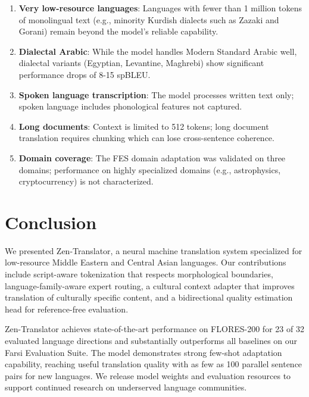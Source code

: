 \documentclass[11pt,twocolumn]{article}
\begin{document}
\begin{enumerate}[leftmargin=*,noitemsep]
  \item \textbf{Very low-resource languages}: Languages with fewer than
        1 million tokens of monolingual text (e.g., minority Kurdish
        dialects such as Zazaki and Gorani) remain beyond the model's
        reliable capability.
  \item \textbf{Dialectal Arabic}: While the model handles Modern Standard
        Arabic well, dialectal variants (Egyptian, Levantine, Maghrebi)
        show significant performance drops of 8-15 spBLEU.
  \item \textbf{Spoken language transcription}: The model processes written
        text only; spoken language includes phonological features not captured.
  \item \textbf{Long documents}: Context is limited to 512 tokens; long
        document translation requires chunking which can lose cross-sentence
        coherence.
  \item \textbf{Domain coverage}: The FES domain adaptation was validated
        on three domains; performance on highly specialized domains (e.g.,
        astrophysics, cryptocurrency) is not characterized.
\end{enumerate}

\section{Conclusion}
\label{sec:conclusion}

We presented Zen-Translator, a neural machine translation system specialized
for low-resource Middle Eastern and Central Asian languages. Our contributions
include script-aware tokenization that respects morphological boundaries,
language-family-aware expert routing, a cultural context adapter that improves
translation of culturally specific content, and a bidirectional quality
estimation head for reference-free evaluation.

Zen-Translator achieves state-of-the-art performance on FLORES-200 for 23 of
32 evaluated language directions and substantially outperforms all baselines on
our Farsi Evaluation Suite. The model demonstrates strong few-shot adaptation
capability, reaching useful translation quality with as few as 100 parallel
sentence pairs for new languages. We release model weights and evaluation
resources to support continued research on underserved language communities.
\end{document}
